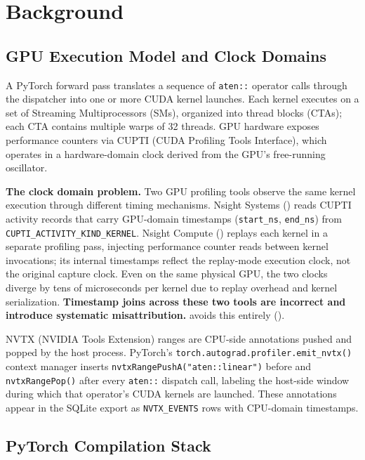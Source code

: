 \section{Background}
\label{sec:background}

\subsection{GPU Execution Model and Clock Domains}

A PyTorch forward pass translates a sequence of \texttt{aten::} operator calls through the
dispatcher into one or more CUDA kernel launches.  Each kernel executes on a set of Streaming
Multiprocessors (SMs), organized into thread blocks (CTAs); each CTA contains multiple warps of
32 threads.  GPU hardware exposes performance counters via CUPTI (CUDA Profiling Tools Interface),
which operates in a hardware-domain clock derived from the GPU's free-running oscillator.

\textbf{The clock domain problem.}  Two GPU profiling tools observe the same kernel execution
through different timing mechanisms.  Nsight Systems (\nsys) reads CUPTI activity records that
carry GPU-domain timestamps (\texttt{start\_ns}, \texttt{end\_ns}) from
\texttt{CUPTI\_ACTIVITY\_KIND\_KERNEL}.  Nsight Compute (\ncu) replays each kernel in a separate
profiling pass, injecting performance counter reads between kernel invocations; its internal
timestamps reflect the replay-mode execution clock, not the original capture clock.  Even on the
same physical GPU, the two clocks diverge by tens of microseconds per kernel due to replay overhead
and kernel serialization.  \textbf{Timestamp joins across these two tools are incorrect and
introduce systematic misattribution.}  \sys avoids this entirely ().

NVTX (NVIDIA Tools Extension) ranges are CPU-side annotations pushed and popped by the host
process.  PyTorch's \texttt{torch.autograd.profiler.emit\_nvtx()} context manager inserts
\texttt{nvtxRangePushA("aten::linear")} before and \texttt{nvtxRangePop()} after every
\texttt{aten::} dispatch call, labeling the host-side window during which that operator's CUDA
kernels are launched.  These annotations appear in the \nsys SQLite export as
\texttt{NVTX\_EVENTS} rows with CPU-domain timestamps.

\subsection{PyTorch Compilation Stack}

